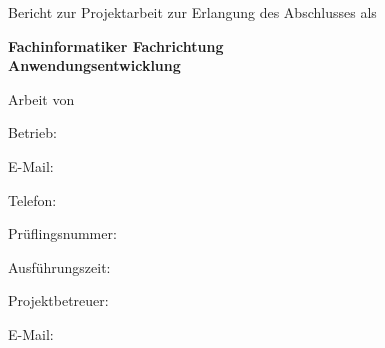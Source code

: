 \begin{titlepage}
	\centering
	{\huge\bfseries \projectTitle \par}
	\vspace{2.5cm}
	{\Large Bericht zur Projektarbeit zur Erlangung des Abschlusses als\par}
	{\Large\textbf{Fachinformatiker Fachrichtung\\Anwendungsentwicklung}\par}
	\vspace{1.5cm}
	{\Large Arbeit von\par}
    {\Large\textbf{\autorName}\par}
    \vspace{2.5cm}
	\begin{flushleft}
        {\large Betrieb: \companyName{}\par}
        {\large E-Mail: \autorEMail{}\par}
        {\large Telefon: \autorTel{}\par}
        {\large Prüflingsnummer: \autorPruefNr{}\par}
        {\large Ausführungszeit: \projTime{}\par}
        \vspace{1cm}
        {\large Projektbetreuer: \autorSupervisorName{}\par}
        {\large E-Mail: \autorSupervisorEMail{}\par}
	\end{flushleft}
\end{titlepage}
